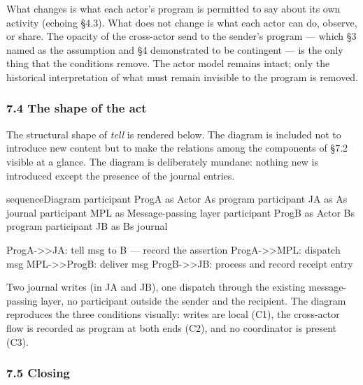 \documentclass[
]{article}
\newenvironment{Shaded}{}{}
\newcommand{\NormalTok}[1]{#1}
\begin{document}
What changes is what each actor's program is permitted to say about its
own activity (echoing §4.3). What does not change is what each actor can
do, observe, or share. The opacity of the cross-actor send to the
sender's program --- which §3 named as the assumption and §4
demonstrated to be contingent --- is the only thing that the conditions
remove. The actor model remains intact; only the historical
interpretation of what must remain invisible to the program is removed.

\subsubsection{7.4 The shape of the act}\label{the-shape-of-the-act}

The structural shape of \emph{tell} is rendered below. The diagram is
included not to introduce new content but to make the relations among
the components of §7.2 visible at a glance. The diagram is deliberately
mundane: nothing new is introduced except the presence of the journal
entries.

\begin{Shaded}
\begin{Highlighting}[]
\NormalTok{sequenceDiagram}
\NormalTok{    participant ProgA as Actor A\textquotesingle{}s program}
\NormalTok{    participant JA as A\textquotesingle{}s journal}
\NormalTok{    participant MPL as Message{-}passing layer}
\NormalTok{    participant ProgB as Actor B\textquotesingle{}s program}
\NormalTok{    participant JB as B\textquotesingle{}s journal}

\NormalTok{    ProgA{-}\textgreater{}\textgreater{}JA: tell msg to B — record the assertion}
\NormalTok{    ProgA{-}\textgreater{}\textgreater{}MPL: dispatch msg}
\NormalTok{    MPL{-}\textgreater{}\textgreater{}ProgB: deliver msg}
\NormalTok{    ProgB{-}\textgreater{}\textgreater{}JB: process and record receipt entry}
\end{Highlighting}
\end{Shaded}

Two journal writes (in JA and JB), one dispatch through the existing
message-passing layer, no participant outside the sender and the
recipient. The diagram reproduces the three conditions visually: writes
are local (C1), the cross-actor flow is recorded as program at both ends
(C2), and no coordinator is present (C3).

\subsubsection{7.5 Closing}\label{closing-3}
\end{document}
